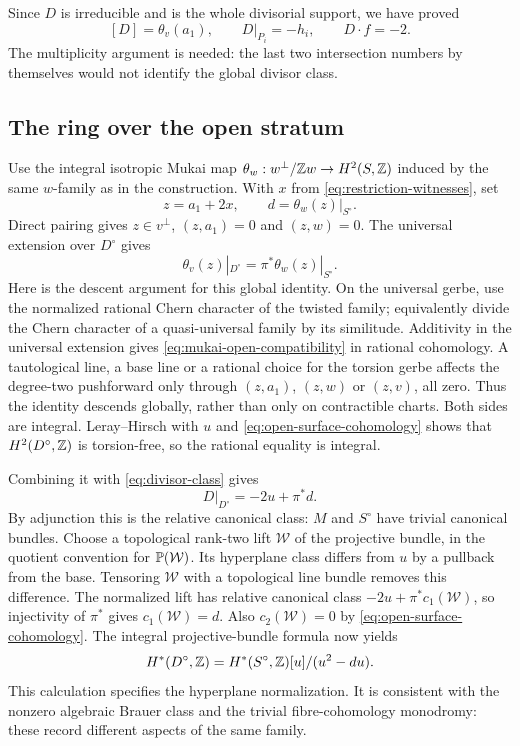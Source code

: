 Since $D$ is irreducible and is the whole
divisorial support, we have proved
\begin{equation}\label{eq:divisor-class}
 [D]=\theta_v(a_1),\qquad D|_{P_i}=-h_i,
 \qquad D\cdot f=-2.
\end{equation}
The multiplicity argument is needed: the last
two intersection numbers by themselves would
not identify the global divisor class.

\subsection{The ring over the open stratum}
Use the integral isotropic Mukai map
$\theta_w:w^\perp/\mathbb Z w\to H^2(S,\mathbb Z)$ induced
by the same $w$-family as in the construction.
With $x$ from \eqref{eq:restriction-witnesses}, set
\[
 z=a_1+2x,\qquad d=\theta_w(z)|_{S^\circ}.
\]
Direct pairing gives $z\in v^\perp$,
$(z,a_1)=0$ and $(z,w)=0$. The universal
extension over $D^\circ$ gives
\begin{equation}\label{eq:mukai-open-compatibility}
 \theta_v(z)|_{D^\circ}=\pi^*\theta_w(z)|_{S^\circ}.
\end{equation}
Here is the descent argument for this global
identity. On the universal gerbe, use the
normalized rational Chern character of the
twisted family; equivalently divide the Chern
character of a quasi-universal family by its
similitude. Additivity in the universal extension
gives \eqref{eq:mukai-open-compatibility} in rational
cohomology. A tautological line, a base line or
a rational choice for the torsion gerbe affects
the degree-two pushforward only through
$(z,a_1)$, $(z,w)$ or $(z,v)$, all zero.
Thus the identity descends globally, rather
than only on contractible charts. Both sides
are integral. Leray--Hirsch with $u$ and
\eqref{eq:open-surface-cohomology} shows that
$H^2(D^\circ,\mathbb Z)$ is torsion-free, so the
rational equality is integral.

Combining it with \eqref{eq:divisor-class} gives
\begin{equation}\label{eq:relative-canonical}
 D|_{D^\circ}=-2u+\pi^*d.
\end{equation}
By adjunction this is the relative canonical
class: $M$ and $S^\circ$ have trivial canonical
bundles. Choose a topological rank-two lift $\mathcal W$
of the projective bundle, in the quotient
convention for $\mathbb P(\mathcal W)$. Its hyperplane class
differs from $u$ by a pullback from the base.
Tensoring $\mathcal W$ with a topological line bundle
removes this difference. The normalized lift
has relative canonical class
$-2u+\pi^*c_1(\mathcal W)$, so injectivity of $\pi^*$
gives $c_1(\mathcal W)=d$. Also $c_2(\mathcal W)=0$ by
\eqref{eq:open-surface-cohomology}. The integral
projective-bundle formula now yields
\begin{equation}\label{eq:open-divisor-ring}
 H^*(D^\circ,\mathbb Z)
   =H^*(S^\circ,\mathbb Z)[u]/(u^2-du).
\end{equation}
This calculation specifies the hyperplane
normalization. It is consistent with the
nonzero algebraic Brauer class and the trivial
fibre-cohomology monodromy: these record
different aspects of the same family.
